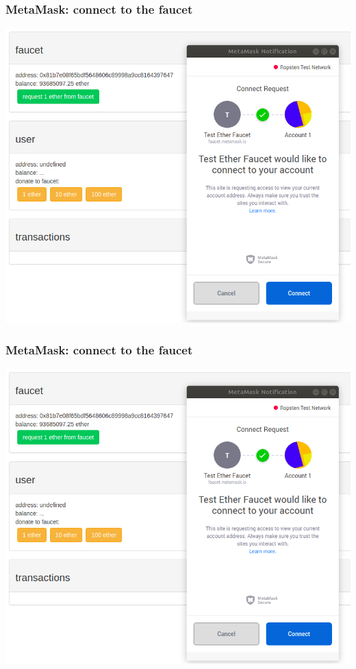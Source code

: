 \documentclass[11pt]{beamer}  %
\begin{document}
\begin{frame}\frametitle{MetaMask: connect to the faucet}

  \begin{center}
    \includegraphics[scale=0.3,clip=false]{pictures/metamask-faucet.png}
  \end{center}

\end{frame}

\begin{frame}\frametitle{MetaMask: connect to the faucet}

  \begin{center}
    \includegraphics[scale=0.3,clip=false]{pictures/metamask-faucet.png}
  \end{center}

\end{frame}
\end{document}
